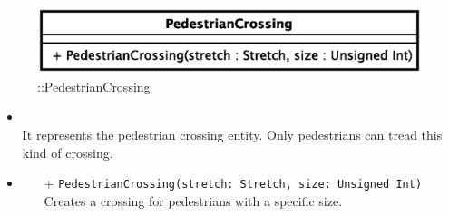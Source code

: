 \begin{figure}[h]
\centering
\includegraphics[scale=0.6,keepaspectratio]{images/solution/app/backend/pedestrian_crossing.eps}
\caption{\pReactiveComponentStretchDecoration::PedestrianCrossing}
\label{fig:sd-app-pedestrian_crossing}
\end{figure}
\FloatBarrier
\begin{itemize}
  \item \textbf{\descr} \\
    It represents the pedestrian crossing entity. Only pedestrians can tread this kind 
of crossing.
\item \textbf{\ops}
  \begin{itemize}
    \item[+] \texttt{PedestrianCrossing(stretch: Stretch, size: Unsigned Int)} \\
Creates a crossing for pedestrians with a specific size.
  	\end{itemize}
\end{itemize}

